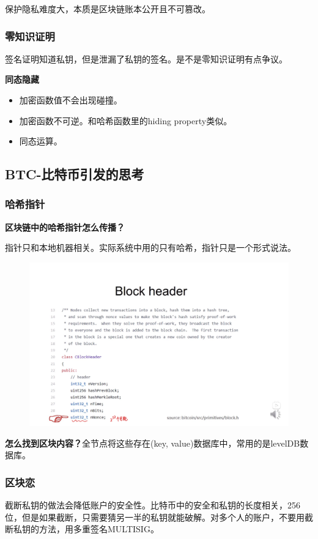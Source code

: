 \documentclass[10pt]{ctexart}
\begin{document}
保护隐私难度大，本质是区块链账本公开且不可篡改。

\subsubsection{零知识证明}
签名证明知道私钥，但是泄漏了私钥的签名。是不是零知识证明有点争议。

\textbf{同态隐藏}
\begin{itemize}
    \item 加密函数值不会出现碰撞。
    \item 加密函数不可逆。和哈希函数里的hiding property类似。
    \item 同态运算。
\end{itemize}
 
\subsection{BTC-比特币引发的思考}
\subsubsection{哈希指针}
\textbf{区块链中的哈希指针怎么传播？}

指针只和本地机器相关。实际系统中用的只有哈希，指针只是一个形式说法。
\begin{figure}[H]
    \centering
    \includegraphics[width=1\textwidth]{courses/区块链技术与应用/lecture13/img1.png} 
\end{figure}
 
\textbf{怎么找到区块内容？}全节点将这些存在(key, value)数据库中，常用的是levelDB数据库。

\subsubsection{区块恋}
截断私钥的做法会降低账户的安全性。比特币中的安全和私钥的长度相关，256位，但是如果截断，只需要猜另一半的私钥就能破解。对多个人的账户，不要用截断私钥的方法，用多重签名MULTISIG。
\end{document}

